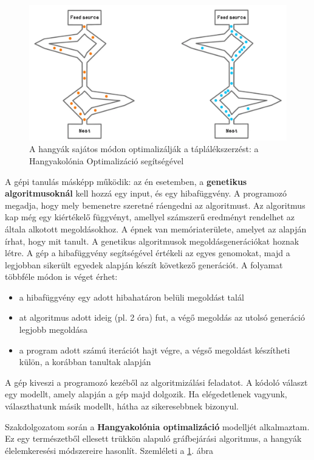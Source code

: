 \begin{figure}[ht!]
	\includegraphics[width=150mm, keepaspectratio]{figures/aco-visualization.png}
	\caption{A hangyák sajátos módon optimalizálják a táplálékszerzést: a Hangyakolónia Optimalizáció segítségével \cite{ACOimage} \label{ACOvisulabel}}
\end{figure}
A gépi tanulás másképp működik: az én esetemben, a \textbf{genetikus algoritmusoknál} kell hozzá egy input, és egy hibafüggvény. A programozó megadja, hogy mely bemenetre szeretné ráengedni az algoritmust. Az algoritmus kap még egy kiértékelő függvényt, amellyel számszerű eredményt rendelhet az általa alkotott megoldásokhoz. A épnek van memóriaterülete, amelyet az alapján írhat, hogy mit tanult. A genetikus algoritmusok megoldásgenerációkat hoznak létre. A gép a hibafüggvény segítségével értékeli az egyes genomokat, majd a legjobban sikerült egyedek alapján készít következő generációt. A folyamat többféle módon is véget érhet:
\begin{itemize}
	\item a hibafüggvény egy adott hibahatáron belüli megoldást talál
	\item at algoritmus adott ideig (pl. 2 óra) fut, a végő megoldás az utolsó generáció legjobb megoldása
	\item a program adott számú iterációt hajt végre, a végső megoldást készítheti külön, a korábban tanultak alapján
\end{itemize}

A gép kiveszi a programozó kezéből az algoritmizálási feladatot. A kódoló választ egy modellt, amely alapján a gép majd dolgozik. Ha elégedetlenek vagyunk, választhatunk másik modellt, hátha az sikeresebbnek bizonyul.

Szakdolgozatom során a \textbf{Hangyakolónia optimalizáció} modelljét alkalmaztam. Ez egy természetből ellesett trükkön alapuló gráfbejárási algoritmus, a hangyák élelemkeresési módszereire hasonlít. Szemléleti a \ref{ACOvisulabel}. ábra



